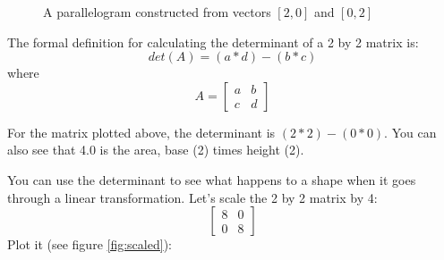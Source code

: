 \begin{figure}[htbp]
    \centering
    \caption{A parallelogram constructed from vectors $\left[2, 0 \right]$ and 
    $\left[0, 2 \right]$}
    \label{fig:twos}
\end{figure}
 
The formal definition for calculating the determinant of a 2 by 2 matrix is:
$$det(A) = (a*d)-(b*c)$$
where
$$A = 
\begin{bmatrix}
a & b  \\
c & d 
\end{bmatrix}
$$

For the matrix plotted above, the determinant is $(2*2)-(0*0)$. You can also 
see that 4.0 is the area, base (2) times height (2).

You can use the determinant to see what happens to a shape when it goes 
through a linear transformation. Let's scale the 2 by 2 matrix by 4:
$$
\begin{bmatrix}
8 & 0  \\
0 & 8 
\end{bmatrix}
$$
Plot it (see figure \ref{fig:scaled}):


